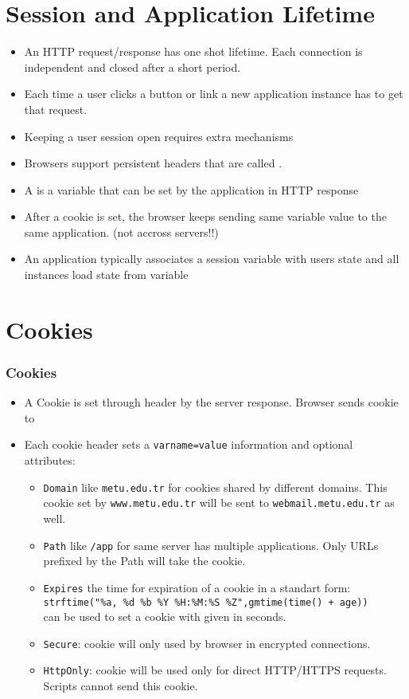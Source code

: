 \documentclass[trans,compress,xcolor=table]{beamer}
\begin{document}
\section{Session and Application Lifetime}
\begin{frame}[fragile]
\begin{itemize}
\item An HTTP request/response has one shot lifetime. Each connection is independent and closed after a short period.
\item Each time a user clicks a button or link a new application instance 
has to get that request.
\item Keeping a user session open requires extra mechanisms
\item Browsers support persistent headers that are called .
\item A  is a variable that can be set by the 
application in HTTP response
\item After a cookie is set, the browser keeps sending same variable value to
the same application. (not accross servers!!)
\item An application typically associates a session variable with users state 
and all instances load state from variable
\end{itemize}
\end{frame}

\section{Cookies}
\begin{frame}[fragile]
\frametitle{Cookies}
\begin{itemize}
\item A Cookie is set through  header by the server response.
Browser sends cookie to 
\item Each cookie header sets a \lstinline!varname=value! information and optional attributes:
\begin{itemize}
\item \lstinline!Domain! like \lstinline!metu.edu.tr! for cookies shared by different domains.
This cookie set by \lstinline!www.metu.edu.tr! will be sent to \lstinline!webmail.metu.edu.tr! as
well.
\item \lstinline!Path! like \lstinline!/app! for same server has multiple applications. Only
URLs prefixed by the Path will take the cookie.
\item \lstinline!Expires! the time for expiration of a cookie in  a standart form:\\
\lstinline!strftime("%a, %d %b %Y %H:%M:%S %Z",gmtime(time() + age))! \\
can be used to set a cookie with given  in seconds.
\item \lstinline!Secure!: cookie will only used by browser in encrypted connections.
\item \lstinline!HttpOnly!: cookie will be used only for direct HTTP/HTTPS requests. Scripts cannot
send this cookie.
\end{itemize}
\end{itemize}
\end{frame}
\end{document}
